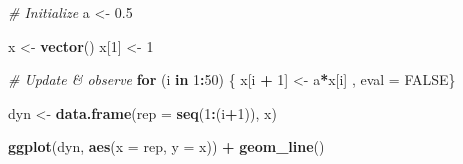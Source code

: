 \documentclass[]{article}
\newenvironment{Shaded}{\begin{snugshade}}{\end{snugshade}}
\newcommand{\KeywordTok}[1]{\textcolor[rgb]{0.13,0.29,0.53}{\textbf{#1}}}
\newcommand{\DataTypeTok}[1]{\textcolor[rgb]{0.13,0.29,0.53}{#1}}
\newcommand{\DecValTok}[1]{\textcolor[rgb]{0.00,0.00,0.81}{#1}}
\newcommand{\FloatTok}[1]{\textcolor[rgb]{0.00,0.00,0.81}{#1}}
\newcommand{\StringTok}[1]{\textcolor[rgb]{0.31,0.60,0.02}{#1}}
\newcommand{\CommentTok}[1]{\textcolor[rgb]{0.56,0.35,0.01}{\textit{#1}}}
\newcommand{\OtherTok}[1]{\textcolor[rgb]{0.56,0.35,0.01}{#1}}
\newcommand{\ControlFlowTok}[1]{\textcolor[rgb]{0.13,0.29,0.53}{\textbf{#1}}}
\newcommand{\OperatorTok}[1]{\textcolor[rgb]{0.81,0.36,0.00}{\textbf{#1}}}
\newcommand{\NormalTok}[1]{#1}
\begin{document}
\begin{Shaded}
\begin{Highlighting}[]
\CommentTok{# Initialize}
\NormalTok{a <-}\StringTok{ }\FloatTok{0.5}

\NormalTok{x <-}\StringTok{ }\KeywordTok{vector}\NormalTok{()}
\NormalTok{x[}\DecValTok{1}\NormalTok{] <-}\StringTok{ }\DecValTok{1}


\CommentTok{# Update & observe}
\ControlFlowTok{for}\NormalTok{ (i }\ControlFlowTok{in} \DecValTok{1}\OperatorTok{:}\DecValTok{50}\NormalTok{) \{}
\NormalTok{  x[i }\OperatorTok{+}\StringTok{ }\DecValTok{1}\NormalTok{] <-}\StringTok{ }\NormalTok{a}\OperatorTok{*}\NormalTok{x[i]}
\NormalTok{, eval =}\StringTok{ }\OtherTok{FALSE}\NormalTok{\}}

\NormalTok{dyn <-}\StringTok{ }\KeywordTok{data.frame}\NormalTok{(}\DataTypeTok{rep =} \KeywordTok{seq}\NormalTok{(}\DecValTok{1}\OperatorTok{:}\NormalTok{(i}\OperatorTok{+}\DecValTok{1}\NormalTok{)), x)}

\KeywordTok{ggplot}\NormalTok{(dyn, }\KeywordTok{aes}\NormalTok{(}\DataTypeTok{x =}\NormalTok{ rep, }\DataTypeTok{y =}\NormalTok{ x)) }\OperatorTok{+}
\StringTok{  }\KeywordTok{geom_line}\NormalTok{()}
\end{Highlighting}
\end{Shaded}
\end{document}
